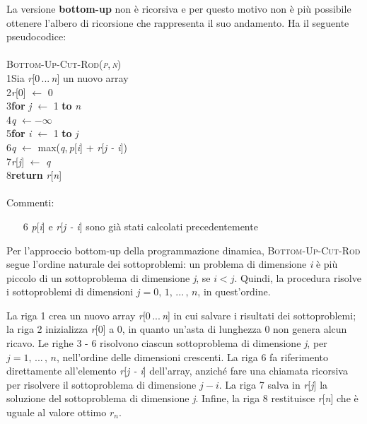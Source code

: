 \documentclass[10pt, a4paper]{report}
\newcommand\firsttab[1][0.5cm]{\hspace*{#1}}
\newcommand\secondtab[1][1cm]{\hspace*{#1}}
\newcommand\thirdtab[1][1.5cm]{\hspace*{#1}}
\begin{document}
La versione \textbf{bottom-up} non è ricorsiva e per questo motivo non è più possibile ottenere l'albero di ricorsione che rappresenta il suo andamento. Ha il seguente pseudocodice:\\\\
\textsc{Bottom-Up-Cut-Rod(\textit{p},\,\textit{n})}\\
1\firsttab Sia \textit{r}[0\,...\,\textit{n}] un nuovo array\\
2\firsttab\textit{r}[0] $\leftarrow$ 0\\
3\firsttab\textbf{for} \textit{j} $\leftarrow$ 1 \textbf{to} \textit{n}\\
4\secondtab\textit{q} $\leftarrow - \infty$\\
5\secondtab\textbf{for} \textit{i} $\leftarrow$ 1 \textbf{to} \textit{j}\\
6\thirdtab\textit{q} $\leftarrow$ max(\textit{q},\,\textit{p}[\textit{i}] + \textit{r}[\textit{j - i}])\\
7\secondtab\textit{r}[\textit{j}] $\leftarrow$ \textit{q}\\
8\firsttab\textbf{return} \textit{r}[\textit{n}]\\\\
Commenti:
\begin{enumerate}
\item[6]\textit{p}[\textit{i}] e \textit{r}[\textit{j - i}] sono già stati calcolati precedentemente
\end{enumerate}
Per l'approccio bottom-up della programmazione dinamica, \textsc{Bottom-Up-Cut-Rod} segue l'ordine naturale dei sottoproblemi: un problema di dimensione \textit{i} è più piccolo di un sottoproblema di dimensione \textit{j}, se $i < j$. Quindi, la procedura risolve i sottoproblemi di dimensioni $j = 0,\,1,\,...\,,\,n$, in quest'ordine.

La riga 1 crea un nuovo array \textit{r}[0\,...\,\textit{n}] in cui salvare i risultati dei sottoproblemi; la riga 2 inizializza \textit{r}[0] a 0, in quanto un'asta di lunghezza 0 non genera alcun ricavo. Le righe 3 - 6 risolvono ciascun sottoproblema di dimensione \textit{j}, per $j = 1,\,...\,,\,n$, nell'ordine delle dimensioni crescenti. La riga 6 fa riferimento direttamente all'elemento \textit{r}[\textit{j - i}] dell'array, anziché fare una chiamata ricorsiva per risolvere il sottoproblema di dimensione $j - i$. La riga 7 salva in \textit{r}[\textit{j}] la soluzione del sottoproblema di dimensione \textit{j}. Infine, la riga 8 restituisce \textit{r}[\textit{n}] che è uguale al valore ottimo $r_n$.\\
\end{document}
